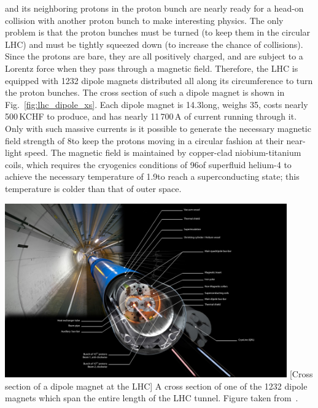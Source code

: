 \pname and its neighboring protons in the proton bunch are nearly ready for a head-on collision with another proton bunch to make interesting physics.
The only problem is that the proton bunches must be turned (to keep them in the circular LHC) and must be tightly squeezed down (to increase the chance of \pp collisions).
Since the protons are bare, they are all positively charged, and are subject to a Lorentz force when they pass through a magnetic field.
Therefore, the LHC is equipped with 1232 dipole magnets distributed all along its circumference to turn the proton bunches.
The cross section of such a dipole magnet is shown in Fig.~\ref{fig:lhc_dipole_xs}.
Each dipole magnet is 14.3\meter long, weighs 35\tonne, costs nearly 500\,KCHF to produce, and has nearly 11\,700\,A of current running through it.
Only with such massive currents is it possible to generate the necessary magnetic field strength of 8\tesla to keep the protons moving in a circular fashion at their near-light speed. 
The magnetic field is maintained by copper-clad niobium-titanium coils, which requires the cryogenics conditions of 96\tonne of superfluid helium-4 to achieve the necessary temperature of 1.9\kelvin to reach a superconducting state; 
this temperature is colder than that of outer space.
\begin{multiFigure}
\centering
    \includegraphics[height=7.5cm,keepaspectratio]{figures/lhc/lhc_dipole_xs.jpg}
        [Cross section of a dipole magnet at the LHC]
        {A cross section of one of the 1232 dipole magnets which span the entire length of the LHC tunnel.
        Figure taken from~\cite{dipole_xs}.} 
    \label{fig:lhc_dipole_xs}
\end{multiFigure}

